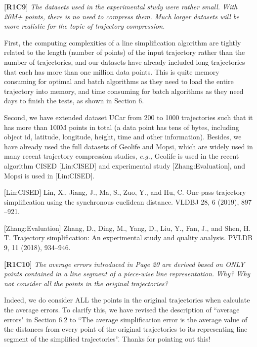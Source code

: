 \documentclass{letter}
\newcommand{\eg}{\emph{e.g.,}\xspace}
\begin{document}
\textbf{[R1C9]} \emph{ The datasets used in the experimental study were rather small. With 20M+ points, there is no need to compress them. Much larger datasets will be more realistic for the topic of trajectory compression.  }

First, the computing complexities of a line simplification algorithm are tightly related to the length (number of points) of the input trajectory rather than the number of trajectories, and our datasets have already included long trajectories that each has more than {one million} data points. This is quite memory consuming for optimal and batch algorithms  as they need to load the entire trajectory into memory, and time consuming for batch algorithms as they need {days} to finish the tests, as shown in Section 6.

Second, we have extended dataset UCar from 200 to 1000 trajectories such that it has more than {100M} points in total (a data point has tens of bytes, including object id, latitude, longitude, height, time and other information). Besides, we have already used the full datasets of Geolife and Mopsi, which are widely used in many recent trajectory compression studies, \eg Geolife is used in the recent algorithm CISED [Lin:CISED] and experimental study [Zhang:Evaluation], and Mopsi is used in [Lin:CISED].  %

[Lin:CISED] Lin, X., Jiang, J., Ma, S., Zuo, Y., and Hu, C. One-pass trajectory simplification using the synchronous euclidean distance. VLDBJ 28, 6 (2019), 897 --921.

[Zhang:Evaluation] Zhang, D., Ding, M., Yang, D., Liu, Y., Fan, J., and Shen, H. T. Trajectory simplification: An experimental study and quality analysis. PVLDB 9, 11 (2018), 934--946.

\textbf{[R1C10]} \emph{The average errors introduced in Page 20 are derived based on ONLY points contained in a line segment of a piece-wise line representation. Why? Why not consider all the points in the original trajectories? }

Indeed, we do consider ALL the points in the original trajectories when calculate the average errors. To clarify this, we have revised the description of ``average errors" in Section 6.2  to ``{The average simplification error is the average value of the distances from every point of the original trajectories to its representing line segment of the simplified trajectories}''. Thanks for pointing out this!
\end{document}
